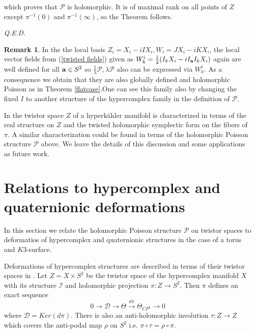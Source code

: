 \documentclass[11pt,oneside,leqno]{amsart}
\theoremstyle{plain}
\theoremstyle{definition}
\newtheorem{rem}[theorem]{Remark}
\begin{document}
which proves that $\mathcal{P}$ is holomorphic. It is of maximal rank on all points of $Z$ except $\pi^{-1}(0)$ and $\pi^{-1}(\infty)$, so the Theorem follows.

{\it Q.E.D.}

\begin{rem}
In the the local basis $Z_i=X_i-iIX_i, W_i = JX_i-iKX_i$, the local vector fields from (\ref{twisted fields}) given as $W_k^i=\frac{1}{2}(I_kX_i -iI_{\bf a}I_kX_i)$ again are well defined for all ${\bf a} \in S^2$ so $\frac{1}{\lambda}\mathcal{P}, \lambda\mathcal{P}$ also can be expressed via $W_k^i$. As a consequence we obtain that they are also globally defined and holomorphic Poisson as in Theorem \ref{flatcase}.One can see this family also by changing the fixed $I$ to another structure of the hypercomplex family in the definition of $\mathcal{P}$.

In \cite{HKLR} the twistor space $Z$ of a hyperk\"ahler manifold is characterized in terms of the real structure on $Z$ and the twisted holomorphic symplectic form on the fibers of $\pi$. A similar characterization could be found in terms of the holomorphic Poisson structure $\mathcal{P}$ above. We leave the details of this discussion and some applications as future work.

\end{rem}

\section{Relations to hypercomplex and quaternionic deformations}

In this section we relate the holomorphic Poisson structure $\mathcal{P}$ on twistor spaces to deformatios of hypercomplex and quaternionic structures in the case of a torus and $K3$-surface.

Deformations of hypercomplex structures are described in terms of their twistor spaces in \cite{PP2}. Let $Z=X\times S^2$ be the twistor space of the hypercomplex manifold $X$ with its structure $\mathcal{I}$ and holomorphic projection $\pi: Z\to S^2$. Then $\pi$ defines an exact sequence
\begin{equation}\label{hcxdefcomplex}
0 \longrightarrow \mathcal{D} \longrightarrow \Theta \stackrel{d\pi}\longrightarrow \Theta_{CP^1}\longrightarrow 0
\end{equation}
where  $\mathcal{D}= Ker(d\pi)$.
There is also an  anti-holomorphic involution $\tau : Z\to Z$ which covers the anti-podal map $\rho$ on $S^2$ i.e. $\pi\circ \tau = \rho\circ\pi$.
\end{document}
